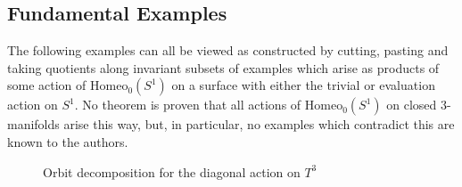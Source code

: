 \documentclass[10pt, oneside]{article}
\newcommand{\homeo}[1][S^1]{\text{Homeo}_0(#1)}
\theoremstyle{definition}
\theoremstyle{definition}
\begin{document}
\subsection{Fundamental Examples}
The following examples can all be viewed as constructed by cutting, pasting and taking quotients along invariant subsets of examples which arise as products of some action of $\homeo[S^1]$ on a surface with either the trivial or evaluation action on $S^1$. No theorem is proven that all actions of $\homeo[S^1]$ on closed 3-manifolds arise this way, but, in particular, no examples which contradict this are known to the authors.

\begin{figure}
    \centering
    
    \caption{Orbit decomposition for the diagonal action on $T^3$}
    \label{fig:3torusdiagonalaction}
\end{figure}
\end{document}
